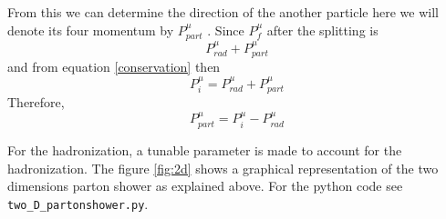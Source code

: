 From this we can determine the direction of the another particle here we will denote its four momentum by $P_{part}^{\mu}$ . Since $P^{\mu}_{f}$ after the splitting is 
\begin{equation}
P_{rad}^{\mu} + P_{part}^{\mu}
\end{equation} and from equation \ref{conservation} then \begin{equation}
P^{\mu}_{i} = P_{rad}^{\mu} + P_{part}^{\mu}
\end{equation} Therefore, \begin{equation}
P_{part}^{\mu} = P^{\mu}_{i} - P_{rad}^{\mu} 
\end{equation}     

For the hadronization, a tunable parameter is made to account for the hadronization. The figure \ref{fig:2d} shows a graphical representation of the two dimensions parton shower as explained above. For the python code see \verb+two_D_partonshower.py+.
     
